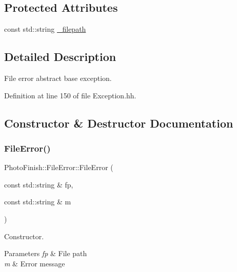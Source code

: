 \subsection*{Protected Attributes}
\begin{DoxyCompactItemize}
\item 
const std\+::string \hyperlink{class_photo_finish_1_1_file_error_a15b57c5056cbcb44ae2a8338cb9b4c08}{\+\_\+filepath}
\end{DoxyCompactItemize}


\subsection{Detailed Description}
File error abstract base exception. 

Definition at line 150 of file Exception.\+hh.



\subsection{Constructor \& Destructor Documentation}
\mbox{\label{class_photo_finish_1_1_file_error_a5c657587ebc9d3656318b6443359f3fd}} 
\subsubsection{\texorpdfstring{File\+Error()}{FileError()}\hspace{0.1cm}{\footnotesize\ttfamily [1/2]}}
{\footnotesize\ttfamily Photo\+Finish\+::\+File\+Error\+::\+File\+Error (\begin{DoxyParamCaption}\item[{const std\+::string \&}]{fp,  }\item[{const std\+::string \&}]{m }\end{DoxyParamCaption})\hspace{0.3cm}{\ttfamily [inline]}}



Constructor. 


\begin{DoxyParams}{Parameters}
{\em fp} & File path \\
\hline
{\em m} & Error message \\
\hline
\end{DoxyParams}


